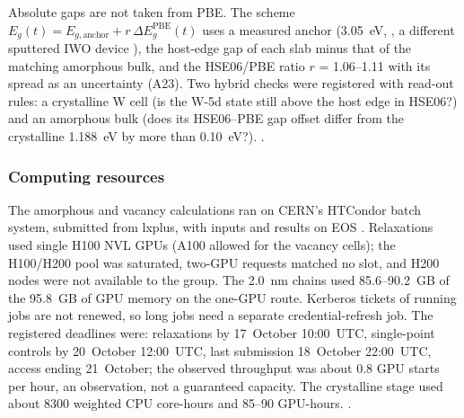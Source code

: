 Absolute gaps are not taken from PBE. The scheme $E_g(t) = E_{g,\mathrm{anchor}} + r\,\Delta E_g^{\mathrm{PBE}}(t)$
uses a measured anchor (3.05~eV, , a different sputtered IWO device \citep{Fan2021}), the host-edge
gap of each slab minus that of the matching amorphous bulk, and the HSE06/PBE ratio $r$ = 1.06--1.11 with its spread as
an uncertainty (A23). %
Two hybrid checks were registered with read-out rules: a crystalline W cell (is the W-5d state still above the host
edge in HSE06?) and an amorphous bulk (does its HSE06--PBE gap offset differ from the crystalline 1.188~eV by more than
0.10~eV?). %
.

\subsubsection{Computing resources}
\label{sec:m-dft-resources}

The amorphous and vacancy calculations ran on CERN's HTCondor batch system, submitted from lxplus, with inputs and
results on EOS \citep{Thain2005}. %
Relaxations used single H100 NVL GPUs (A100 allowed for the vacancy cells); the H100/H200 pool was saturated, two-GPU
requests matched no slot, and H200 nodes were not available to the group. %
The \SI{2.0}{nm} chains used 85.6--90.2~GB of the 95.8~GB of GPU memory on the one-GPU route. %
Kerberos tickets of running jobs are not renewed, so long jobs need a separate credential-refresh job. %
The registered deadlines were: relaxations by 17~October 10:00~UTC, single-point controls by 20~October 12:00~UTC, last
submission 18~October 22:00~UTC, access ending 21~October; the observed throughput was about 0.8 GPU starts per hour,
an observation, not a guaranteed capacity. %
The crystalline stage used about 8300 weighted CPU core-hours and 85--90 GPU-hours. %
.
